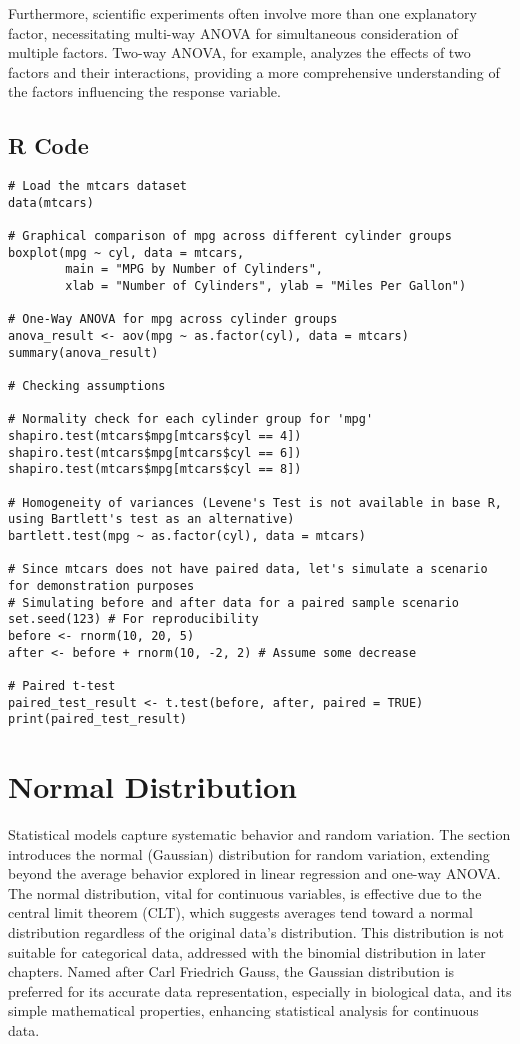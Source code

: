 \documentclass{article}
\begin{document}
Furthermore, scientific experiments often involve more than one explanatory factor, necessitating multi-way ANOVA for simultaneous consideration of multiple factors. Two-way ANOVA, for example, analyzes the effects of two factors and their interactions, providing a more comprehensive understanding of the factors influencing the response variable.

\subsection{R Code}

\begin{lstlisting}
# Load the mtcars dataset
data(mtcars)

# Graphical comparison of mpg across different cylinder groups
boxplot(mpg ~ cyl, data = mtcars,
        main = "MPG by Number of Cylinders",
        xlab = "Number of Cylinders", ylab = "Miles Per Gallon")

# One-Way ANOVA for mpg across cylinder groups
anova_result <- aov(mpg ~ as.factor(cyl), data = mtcars)
summary(anova_result)

# Checking assumptions

# Normality check for each cylinder group for 'mpg'
shapiro.test(mtcars$mpg[mtcars$cyl == 4])
shapiro.test(mtcars$mpg[mtcars$cyl == 6])
shapiro.test(mtcars$mpg[mtcars$cyl == 8])

# Homogeneity of variances (Levene's Test is not available in base R, using Bartlett's test as an alternative)
bartlett.test(mpg ~ as.factor(cyl), data = mtcars)

# Since mtcars does not have paired data, let's simulate a scenario for demonstration purposes
# Simulating before and after data for a paired sample scenario
set.seed(123) # For reproducibility
before <- rnorm(10, 20, 5)
after <- before + rnorm(10, -2, 2) # Assume some decrease

# Paired t-test
paired_test_result <- t.test(before, after, paired = TRUE)
print(paired_test_result)
\end{lstlisting}

\section{Normal Distribution}

Statistical models capture systematic behavior and random variation. The section introduces the normal (Gaussian) distribution for random variation, extending beyond the average behavior explored in linear regression and one-way ANOVA. The normal distribution, vital for continuous variables, is effective due to the central limit theorem (CLT), which suggests averages tend toward a normal distribution regardless of the original data's distribution. This distribution is not suitable for categorical data, addressed with the binomial distribution in later chapters. Named after Carl Friedrich Gauss, the Gaussian distribution is preferred for its accurate data representation, especially in biological data, and its simple mathematical properties, enhancing statistical analysis for continuous data.
\end{document}
